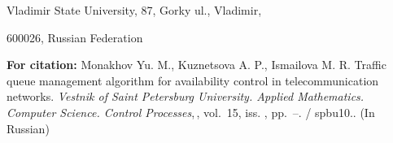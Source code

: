 
{\normalsize

\vskip 6mm


}

\vskip 2mm

{\small


\vskip 2mm




{\footnotesize

\noindent%
Vladimir State University,  87, Gorky ul., Vladimir,

\noindent%
600026, Russian Federation

}


\vskip3mm


\noindent \textbf{For citation:}  Monakhov Yu. M., Kuznetsova A.
P., Ismailova M. R. Traffic queue mana\-ge\-ment algorithm for
availability control in telecommunication networks. {\it Vestnik
of Saint Petersburg University. Applied Mathematics. Computer
Science. Control Processes},\,\issueyear, vol.~15, iss. \issuenum,
pp.~\pageref{p8}--\pageref{p8e}.
\doivyp/\enskip%
\!\!\!spbu10.\issueyear.  (In Russian)

\vskip3mm

}
